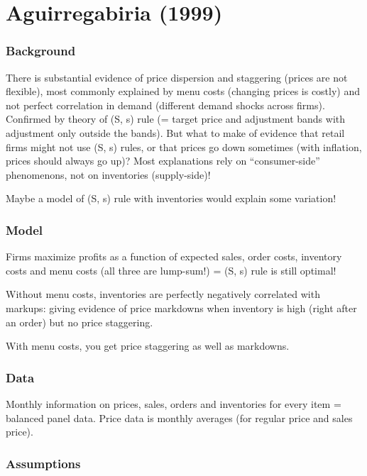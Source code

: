 \section{Aguirregabiria (1999)}

\subsubsection{Background}

There is substantial evidence of price dispersion and staggering (prices are not flexible), most commonly explained by menu costs (changing prices is costly) and not perfect correlation in demand (different demand shocks across firms). Confirmed by theory of (S, s) rule (= target price and adjustment bands with adjustment only outside the bands). But what to make of evidence that retail firms might not use (S, s) rules, or that prices go down sometimes (with inflation, prices should always go up)? Most explanations rely on ``consumer-side'' phenomenons, not on inventories (supply-side)!

Maybe a model of (S, s) rule with inventories would explain some variation!

\subsubsection{Model}

Firms maximize profits as a function of expected sales, order costs, inventory costs and menu costs (all three are lump-sum!) = (S, s) rule is still optimal!

Without menu costs, inventories are perfectly negatively correlated with markups: giving evidence of price markdowns when inventory is high (right after an order) but no price staggering.

With menu costs, you get price staggering as well as markdowns.

\subsubsection{Data}

Monthly information on prices, sales, orders and inventories for every item = balanced panel data. Price data is monthly averages (for regular price and sales price).

\subsubsection{Assumptions}


